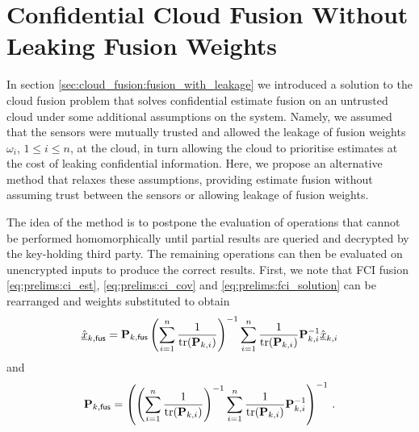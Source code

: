 \section{Confidential Cloud Fusion Without Leaking Fusion Weights}\label{sec:cloud_fusion:fusion_without_leakage}
In section \ref{sec:cloud_fusion:fusion_with_leakage} we introduced a solution to the cloud fusion problem that solves confidential estimate fusion on an untrusted cloud under some additional assumptions on the system. Namely, we assumed that the sensors were mutually trusted and allowed the leakage of fusion weights $\omega_i$, $1\leq i\leq n$, at the cloud, in turn allowing the cloud to prioritise estimates at the cost of leaking confidential information. Here, we propose an alternative method that relaxes these assumptions, providing estimate fusion without assuming trust between the sensors or allowing leakage of fusion weights. 

The idea of the method is to postpone the evaluation of operations that cannot be performed homomorphically until partial results are queried and decrypted by the key-holding third party. The remaining operations can then be evaluated on unencrypted inputs to produce the correct results. First, we note that FCI fusion \eqref{eq:prelims:ci_est}, \eqref{eq:prelims:ci_cov} and \eqref{eq:prelims:fci_solution} can be rearranged and weights substituted to obtain
\begin{equation}\label{eq:cloud_fusion:secfci2_est_rearrange}
    \hat{{\underline{x}}}_{k,\mathsf{fus}} = {{\mathbf{P}}}_{k,\mathsf{fus}}\left(\sum_{i=1}^n \frac{1}{\operatorname{tr}({{\mathbf{P}}}_{k,i})}\right)^{-1}\sum_{i=1}^n\frac{1}{\operatorname{tr}({{\mathbf{P}}}_{k,i})}{{\mathbf{P}}}_{k,i}^{-1}\hat{{\underline{x}}}_{k,i}
\end{equation}
and
\begin{equation}\label{eq:cloud_fusion:secfci2_cov_rearrange}
    {\ensuremath{{\mathbf{P}}}}_{k,\mathsf{fus}} = \left(\left(\sum_{i=1}^n \frac{1}{\operatorname{tr}({{\mathbf{P}}}_{k,i})}\right)^{-1}\sum_{i=1}^n \frac{1}{\operatorname{tr}({{\mathbf{P}}}_{k,i})}{{\mathbf{P}}}_{k,i}^{-1}\right)^{-1}\,.
\end{equation}

